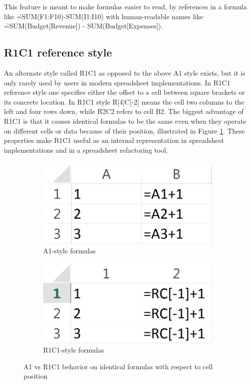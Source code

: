 This feature is meant to make formulas easier to read, by references in a formula like \f{=SUM(F1:F10)-SUM(I1:I10)} with human-readable names like \f{=SUM(Budget[Revenue]) - SUM(Budget[Expenses])}.

\subsection{R1C1 reference style}

An alternate style called R1C1 as opposed to the above A1 style exists, but it is only rarely used by users in modern spreadsheet implementations.
In R1C1 reference style one specifies either the offset to a cell between square brackets or its concrete location.
In R1C1 style \f{R[4]C[-2]} means the cell two columns to the left and four rows down, while \f{R2C2} refers to cell B2.
The biggest advantage of R1C1 is that it causes identical formulas to be the same even when they operate on different cells or data because of their position, illustrated in Figure \ref{fig:r1c1comp}.
These properties make R1C1 useful as an internal representation in spreadsheet implementations and in a spreadsheet refactoring tool.

\begin{figure}
\centerfloat
\begin{subfigure}[t]{0.35\textwidth}
\includegraphics[width=1\textwidth]{anatomy/r1c1comp-a1}
\caption{A1-style formulas}
\end{subfigure}
\hspace{0.1\textwidth}
\begin{subfigure}[t]{0.35\textwidth}
\includegraphics[width=1\textwidth]{anatomy/r1c1comp-r1c1}
\caption{R1C1-style formulas}
\end{subfigure}
\caption{A1 vs R1C1 behavior on identical formulas with respect to cell position}
\label{fig:r1c1comp}
\end{figure}

